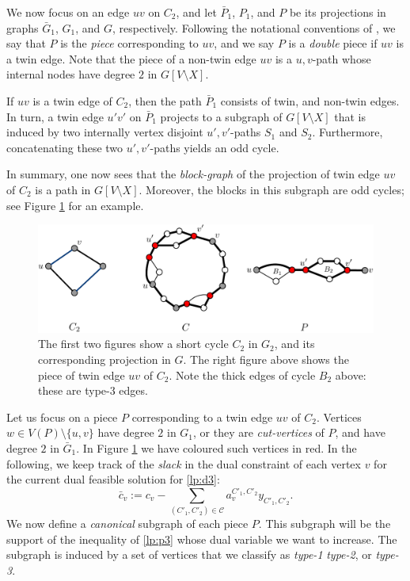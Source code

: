 \documentclass{article}
\newcommand{\C}{\ensuremath{\mathcal{C}}}
\newcommand{\0}{\mathbb{0}}
\newcommand{\1}{\mathbb{1}}
\begin{document}
We now focus on an edge $uv$ on $C_2$, and let $\bar{P}_1$, $P_1$, and $P$
be its projections in graphs $\bar{G}_1$, $G_1$, and $G$, respectively.  
Following the notational conventions of 
\cite{FJP10}, we say that $P$ is the {\em piece} corresponding to $uv$, and we say $P$ is a \emph{double} piece if $uv$ is a twin edge. 
Note that the piece of a non-twin edge $uv$ is a $u,v$-path whose
internal nodes have degree $2$ in $G[V\setminus X]$.

If $uv$ is a twin edge of $C_2$, then the path $\bar{P}_1$ consists of twin, and non-twin
edges. In turn, a twin edge $u'v'$ on $\bar{P}_1$ projects to a
subgraph of $G[V \setminus X]$ that is induced by two internally vertex
disjoint $u',v'$-paths $S_1$ and $S_2$. Furthermore, concatenating these two
$u',v'$-paths yields an odd cycle. 

In summary, one now sees that
the {\em block-graph} of the projection of twin edge $uv$ of $C_2$ is 
a path in $G[V\setminus X]$. Moreover, the
blocks in this subgraph are odd cycles; see Figure \ref{fig:cycG2} for
an example.

\begin{figure}[b]
  \begin{center}
    \includegraphics[width=.8\textwidth]{cycG2.pdf}
  \end{center}
  \caption{\label{fig:cycG2}The first two figures show a  short cycle $C_2$ in $G_2$, and its
    corresponding projection in $G$. The right figure above shows the piece
    of twin edge $uv$ of $C_2$. Note the thick edges of cycle $B_2$ above: these
    are type-3 edges.}
\end{figure}

Let us focus on a piece $P$ corresponding to a twin edge $uv$ of
$C_2$. Vertices $w \in V(P)\setminus  \{u,v\}$ have degree $2$ in
$G_1$, or they are {\em cut-vertices} of $P$, and have degree $2$ in
$\bar{G}_1$. In Figure \ref{fig:cycG2} we have coloured such vertices
in red.
In the following, we keep track of the 
{\em slack} in the dual constraint of each vertex $v$ for the current dual feasible
solution for \eqref{lp:d3}:
\[ \bar{c}_v := c_v - \sum_{(C'_1,C'_2) \in \C} a^{C'_1,C'_2}_vy_{C'_1,C'_2}.\]
We now define a {\em canonical} subgraph of each piece $P$. 
This subgraph will be the support of the inequality of \eqref{lp:p3} whose dual variable
we want to increase. The subgraph is induced by a set of vertices 
that we classify as {\em type-1}  
{\em type-2}, or {\em type-3}.
\end{document}

